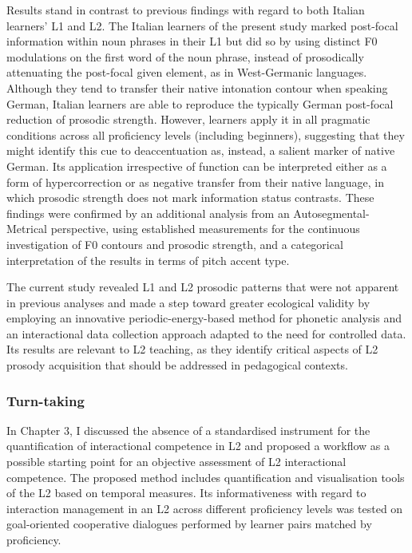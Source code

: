 \begin{stylecaption}
\textup{Results stand in contrast to previous findings with regard to both Italian learners’ L1 and L2. The Italian learners of the present study marked post-focal information within noun phrases in their L1 but did so by using distinct F0 modulations on the first word of the noun phrase, instead of prosodically attenuating the post-focal given element, as in West-Germanic languages. Although they tend to transfer their native intonation contour when speaking German, Italian learners are able to reproduce the typically German post-focal reduction of prosodic strength. However, learners apply it in all pragmatic conditions across all proficiency levels (including beginners), suggesting that they might identify this cue to deaccentuation as, instead, a salient marker of native German. Its application irrespective of function can be interpreted either as a form of hypercorrection or as negative transfer from their native language, in which prosodic strength does not mark information status contrasts. These findings were confirmed by an additional analysis from an Autosegmental-Metrical perspective, using established measurements for the continuous investigation of F0 contours and prosodic strength, and a categorical interpretation of the results in terms of pitch accent type.}
\end{stylecaption}

\begin{stylecaption}
\textup{The current study revealed L1 and L2 prosodic patterns that were not apparent in previous analyses and made a step toward greater ecological validity by employing an innovative periodic-energy-based method for phonetic analysis and an interactional data collection approach adapted to the need for controlled data. Its results are relevant to L2 teaching, as they identify critical aspects of L2 prosody acquisition that should be addressed in pedagogical contexts.}
\end{stylecaption}

\subsubsection{Turn-taking}
\hypertarget{Toc191305963}{}\begin{stylecaption}
\textup{In Chapter 3, I discussed the absence of a standardised instrument for the quantification of interactional competence in L2 and proposed a workflow as a possible starting point for an objective assessment of L2 interactional competence. The proposed method includes quantification and visualisation tools of the L2 based on temporal measures. Its informativeness with regard to interaction management in an L2 across different proficiency levels was tested on goal-oriented cooperative dialogues performed by learner pairs matched by proficiency.}
\end{stylecaption}

